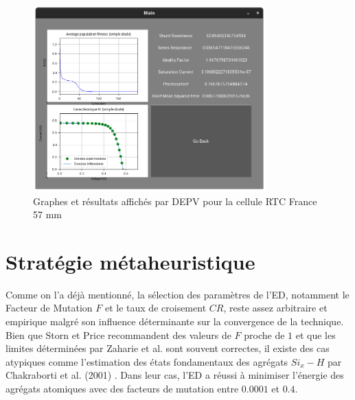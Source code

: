 \begin{figure}[H]
  \begin{center}
    \includegraphics[width=0.8\textwidth]{resources/reswindow.png}
    \caption{Graphes et résultats affichés par DEPV pour la cellule RTC France 57 mm}
    \label{fig:depvres}
  \end{center}
\end{figure}

\section{Stratégie métaheuristique}
Comme on l'a déjà mentionné, la sélection des paramètres de l'ED, notamment le Facteur de Mutation $F$ et le taux de croisement $CR$, reste assez arbitraire et empirique malgré son influence déterminante sur la convergence de la technique. Bien que Storn et Price \cite{Price2005} recommandent des valeurs de $F$ proche de $1$ et que les limites déterminées par Zaharie et al. \cite{Zaharie2002} sont souvent correctes, il existe des cas atypiques comme l'estimation des états fondamentaux des agrégats $Si_{x}-H$ par Chakraborti et al. (2001) \cite{Chakraborti2001}. Dans leur cas, l'ED a réussi à minimiser l'énergie des agrégats atomiques avec des facteurs de mutation entre $0.0001$ et $0.4$.

